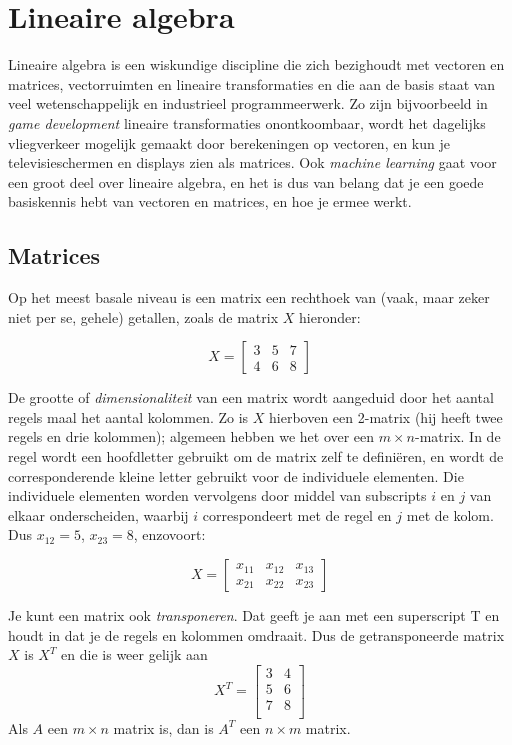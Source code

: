 
\section{Lineaire algebra}
Lineaire algebra is een wiskundige discipline die zich bezighoudt met vectoren en matrices, vectorruimten en lineaire transformaties en die aan de basis staat van veel wetenschappelijk en industrieel programmeerwerk. Zo zijn bijvoorbeeld in \textit{game development} lineaire transformaties onontkoombaar, wordt het dagelijks vliegverkeer mogelijk gemaakt door berekeningen op vectoren, en kun je televisieschermen en displays zien als matrices. Ook \textit{machine learning} gaat voor een groot deel over lineaire algebra, en het is dus van belang dat je een goede basiskennis hebt van vectoren en matrices, en hoe je ermee werkt.

\subsection{Matrices}
Op het meest basale niveau is een matrix een rechthoek van (vaak, maar zeker niet per se, gehele) getallen, zoals de matrix $X$ hieronder:

\[ 
X = \begin{bmatrix} 
3 & 5 & 7 \\
4 & 6 & 8
\end{bmatrix}
\] 

De grootte of \textit{dimensionaliteit} van een matrix wordt aangeduid door het aantal regels maal het aantal kolommen. Zo is $X$ hierboven een 2-matrix (hij heeft twee regels en drie kolommen); algemeen hebben we het over een $m \times n$-matrix. In de regel wordt een hoofdletter gebruikt om de matrix zelf te definiëren, en wordt de corresponderende kleine letter gebruikt voor de individuele elementen. Die individuele elementen worden vervolgens door middel van subscripts $i$ en $j$ van elkaar onderscheiden, waarbij $i$ correspondeert met de regel en $j$ met de kolom. Dus $x_{12} = 5$, $x_{23} = 8$, enzovoort:

\[ 
X = \begin{bmatrix} 
x_{11} & x_{12} & x_{13} \\
x_{21} & x_{22} & x_{23}
\end{bmatrix}
\] 

Je kunt een matrix ook \textit{transponeren}. Dat geeft je aan met een superscript T en houdt in dat je de regels en kolommen omdraait. Dus de getransponeerde matrix $X$ is $X^T$ en die is weer gelijk aan
%
\[ 
X^T = \begin{bmatrix} 
3 & 4 \\
5 & 6 \\
7 & 8 \\
\end{bmatrix}
\] 
%
Als $A$ een $m \times n$ matrix is, dan is $A^T$ een $n \times m$ matrix.

